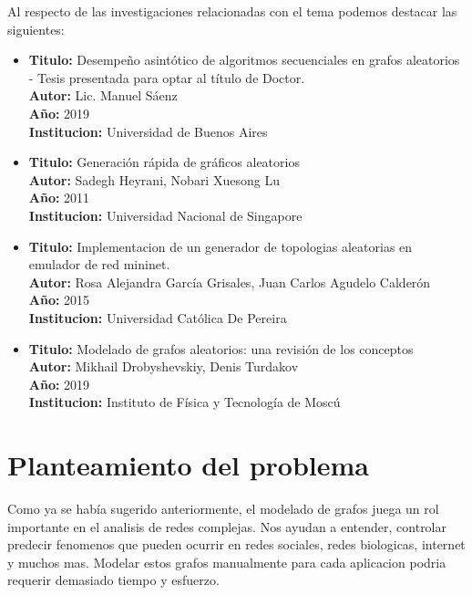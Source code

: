 \documentclass[11pt]{extarticle}
\begin{document}
Al respecto de las investigaciones relacionadas con el tema podemos destacar las siguientes:

\begin{itemize}
  \item \textbf{Titulo:} Desempeño asintótico de algoritmos secuenciales
  en grafos aleatorios - Tesis presentada para optar al título de Doctor.\\
  \textbf{Autor:} Lic. Manuel Sáenz \\
  \textbf{A\~no:} 2019\\
  \textbf{Institucion:} Universidad de Buenos Aires\\
\end{itemize}

\begin{itemize}
  \item \textbf{Titulo:} Generación rápida de gráficos aleatorios\\
  \textbf{Autor:} Sadegh Heyrani, Nobari Xuesong Lu \\
  \textbf{A\~no:} 2011\\
  \textbf{Institucion:} Universidad Nacional de Singapore\\
\end{itemize}

\begin{itemize}
  \item \textbf{Titulo:} Implementacion de un generador de topologias aleatorias en emulador de red mininet.\\
  \textbf{Autor:} Rosa Alejandra García Grisales, Juan Carlos Agudelo Calderón\\
  \textbf{A\~no:} 2015\\
  \textbf{Institucion:} Universidad Católica De Pereira\\
\end{itemize}

\begin{itemize}
  \item \textbf{Titulo:} Modelado de grafos aleatorios: una revisión de los conceptos\\
  \textbf{Autor:} Mikhail Drobyshevskiy, Denis Turdakov\\
  \textbf{A\~no:} 2019\\
  \textbf{Institucion:} Instituto de Física y Tecnología de Moscú\\
\end{itemize}



\section{Planteamiento del problema}
  Como ya se hab\'ia sugerido anteriormente, el modelado de grafos juega un rol 
  importante en el analisis de redes complejas. Nos ayudan a entender, controlar
  predecir fenomenos que pueden ocurrir en redes sociales, redes biologicas, internet
  y muchos mas. Modelar estos grafos manualmente para cada aplicacion podria requerir
  demasiado tiempo y esfuerzo.
\end{document}
